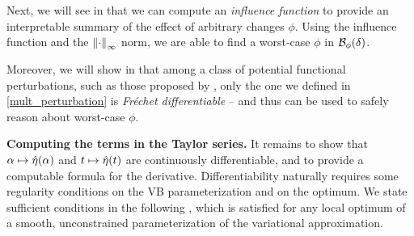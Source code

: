Next, we will see in  that we can compute an
\emph{influence function} to provide an interpretable summary of the effect of
arbitrary changes $\phi$.  Using the influence function and the
$\left\Vert\cdot\right\Vert_{\infty}$ norm, we are able to find a worst-case $\phi$ in
$\mathcal{B}_\phi(\delta)$.

Moreover, we will show in  that
among a class of potential functional perturbations, such as those
proposed by \citet{gustafson:1996:local},
only the one we defined in \eqref{mult_perturbation} is {\em Fr{\'e}chet
differentiable} -- and thus can be used to safely reason about worst-case
$\phi$.

\noindent \textbf{Computing the terms in the Taylor series.}  It remains to show
that $\alpha \mapsto \hat\eta(\alpha)$ and $t \mapsto \hat\eta(t)$ are
continuously differentiable, and to provide a computable formula for the
derivative.
%
Differentiability naturally requires some regularity conditions on the VB
parameterization and on the optimum.  We state sufficient conditions in the
following , which is satisfied for any local optimum of a
smooth, unconstrained parameterization of the variational approximation.

